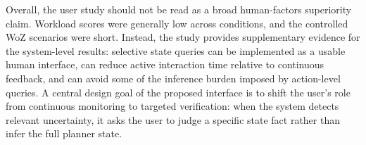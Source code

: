 Overall, the user study should not be read as a broad human-factors superiority claim. Workload scores were generally low across conditions, and the controlled WoZ scenarios were short. Instead, the study provides supplementary evidence for the system-level results: selective state queries can be implemented as a usable human interface, can reduce active interaction time relative to continuous feedback, and can avoid some of the inference burden imposed by action-level queries. A central design goal of the proposed interface is to shift the user's role from continuous monitoring to targeted verification: when the system detects relevant uncertainty, it asks the user to judge a specific state fact rather than infer the full planner state.
